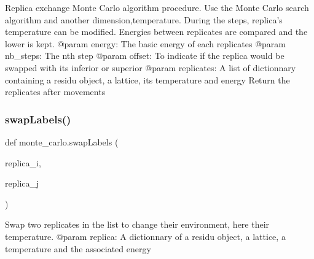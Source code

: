 \begin{DoxyVerb}Replica exchange Monte Carlo algorithm procedure.
Use the Monte Carlo search algorithm and another dimension,temperature.
During the steps, replica's temperature can be modified.
Energies between replicates are compared and the lower is kept.
    @param energy: The basic energy of each replicates
    @param nb_steps: The nth step
    @param offset: To indicate if the replica would be swapped with its
                   inferior or superior
    @param replicates: A list of dictionnary containing a residu object,
                       a lattice, its temperature and energy
    Return the replicates after movements
\end{DoxyVerb}
 \mbox{\label{namespacemonte__carlo_a21436e47939949397ec5f7c615200be5}} 
\subsubsection{\texorpdfstring{swap\+Labels()}{swapLabels()}}
{\footnotesize\ttfamily def monte\+\_\+carlo.\+swap\+Labels (\begin{DoxyParamCaption}\item[{}]{replica\+\_\+i,  }\item[{}]{replica\+\_\+j }\end{DoxyParamCaption})}

\begin{DoxyVerb}Swap two replicates in the list to change their environment, here their
temperature.
    @param replica: A dictionnary of a residu object, a lattice,
                    a temperature and the associated energy
\end{DoxyVerb}
 
